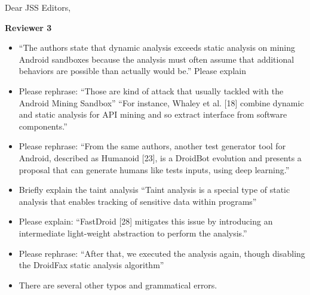 \documentclass[12pt,english]{scrartcl}
\begin{document}
\begin{letter}{Dear JSS Editors,}
\begin{itemize}
\end{itemize}

{\bf Reviewer 3}

\begin{itemize}

\item ``The authors state that dynamic analysis exceeds static analysis on mining Android sandboxes because the
analysis must often assume that additional behaviors are possible than actually would be.''
Please explain

\vspace{0.2cm}

\item Please rephrase:
``Those are kind of attack that usually tackled with the Android Mining Sandbox''
``For instance, Whaley et al. [18] combine dynamic and static analysis for API mining and so extract interface from software components.''

\vspace{0.2cm}

\item Please rephrase:
``From the same authors, another test generator tool for Android, described as Humanoid [23], is a DroidBot evolution and
presents a proposal that can generate humans like tests inputs, using deep learning.''

\vspace{0.2cm}

\item Briefly explain the taint analysis
``Taint analysis is a special type of static analysis that enables tracking of sensitive data within programs''

\vspace{0.2cm}

\item Please explain:
``FastDroid [28] mitigates this issue by introducing an intermediate light-weight abstraction to perform the analysis.''

\vspace{0.2cm}

\item Please rephrase: ``After that, we executed the analysis again, though disabling the DroidFax static analysis algorithm''

\vspace{0.2cm}

\item There are several other typos and grammatical errors.

\vspace{0.2cm}


\end{itemize}
\end{letter}
\end{document}
